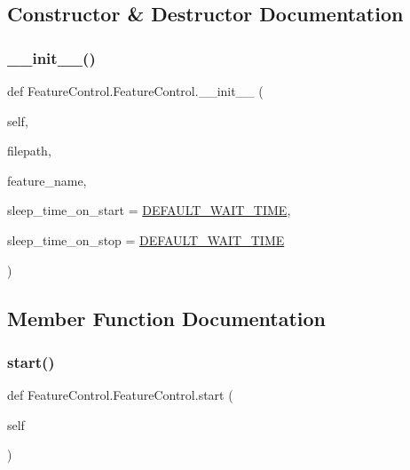 \subsection{Constructor \& Destructor Documentation}
\mbox{\label{classFeatureControl_1_1FeatureControl_aaddbe7a1596f71ce1a6d462e728c438b}} 
\subsubsection{\texorpdfstring{\+\_\+\+\_\+init\+\_\+\+\_\+()}{\_\_init\_\_()}}
{\footnotesize\ttfamily def Feature\+Control.\+Feature\+Control.\+\_\+\+\_\+init\+\_\+\+\_\+ (\begin{DoxyParamCaption}\item[{}]{self,  }\item[{}]{filepath,  }\item[{}]{feature\+\_\+name,  }\item[{}]{sleep\+\_\+time\+\_\+on\+\_\+start = {\ttfamily \hyperlink{namespaceFeatureControl_aeebd4e13e6a3a0dde7d720af530ae36d}{D\+E\+F\+A\+U\+L\+T\+\_\+\+W\+A\+I\+T\+\_\+\+T\+I\+ME}},  }\item[{}]{sleep\+\_\+time\+\_\+on\+\_\+stop = {\ttfamily \hyperlink{namespaceFeatureControl_aeebd4e13e6a3a0dde7d720af530ae36d}{D\+E\+F\+A\+U\+L\+T\+\_\+\+W\+A\+I\+T\+\_\+\+T\+I\+ME}} }\end{DoxyParamCaption})}



\subsection{Member Function Documentation}
\mbox{\label{classFeatureControl_1_1FeatureControl_a21f4c45cce80b2be3a1110d44e12fbfc}} 
\subsubsection{\texorpdfstring{start()}{start()}}
{\footnotesize\ttfamily def Feature\+Control.\+Feature\+Control.\+start (\begin{DoxyParamCaption}\item[{}]{self }\end{DoxyParamCaption})}

